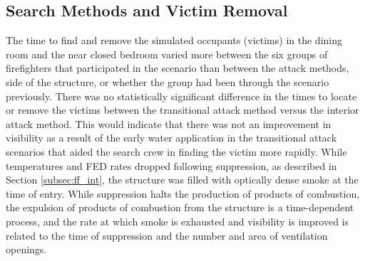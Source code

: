 \documentclass[12pt,oneside]{article}
\begin{document}
\subsection{Search Methods and Victim Removal}
\label{subsec:search}
The time to find and remove the simulated occupants (victims) in the dining room and the near closed bedroom varied more between the six groups of firefighters that participated in the scenario than between the attack methods, side of the structure, or whether the group had been through the scenario previously. There was no statistically significant difference in the times to locate or remove the victims between the transitional attack method versus the interior attack method. This would indicate that there was not an improvement in visibility as a result of the early water application in the transitional attack scenarios that aided the search crew in finding the victim more rapidly. While temperatures and FED rates dropped following suppression, as described in Section \ref{subsec:ff_int}, the structure was filled with optically dense smoke at the time of entry. While suppression halts the production of products of combustion, the expulsion of products of combustion from the structure is a time-dependent process, and the rate at which smoke is exhausted and visibility is improved is related to the time of suppression and the number and area of ventilation openings.
\end{document}
